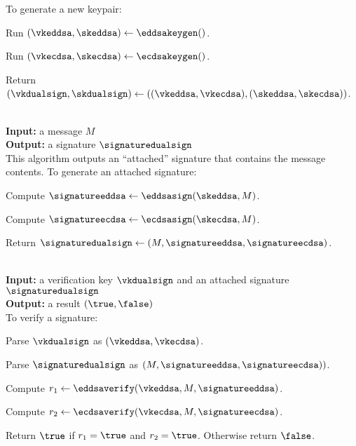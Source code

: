\vspace{-1.5em}
To generate a new keypair:

\vspace{-1.5em}
\begingroup
\RaggedRight
\begin{enumerate*}
\item Run $(\vkeddsa, \skeddsa) \leftarrow \eddsakeygen()$.
\item Run $(\vkecdsa, \skecdsa) \leftarrow \ecdsakeygen()$.
\item Return $(\vkdualsign, \skdualsign) \leftarrow \left( (\vkeddsa,\vkecdsa), (\skeddsa,\skecdsa) \right)$.
\end{enumerate*}
\endgroup


{\underline {\bf \dualsignsign}}\\
{\bf Input:} a message $M$\\
{\bf Output:} a signature $\signaturedualsign$ \\

\vspace{-1.5em}
This algorithm outputs an ``attached'' signature that contains the message contents. To generate an attached signature:

\vspace{-1.5em}
\begingroup
\RaggedRight
\begin{enumerate*}
\item Compute $\signatureeddsa \leftarrow \eddsasign(\skeddsa, M)$.
\item Compute $\signatureecdsa \leftarrow \ecdsasign(\skecdsa, M)$.
\item Return $\signaturedualsign \leftarrow \left(M, \signatureeddsa, \signatureecdsa \right)$.
\end{enumerate*}
\endgroup


{\underline {\bf \dualsignverify}}\\
{\bf Input:} a verification key $\vkdualsign$ and an attached signature $\signaturedualsign$\\
{\bf Output:} a result $(\true, \false)$ \\

\vspace{-1.5em}
To verify a signature:

\vspace{-1.5em}
\begin{enumerate*}
\item Parse $\vkdualsign$ as $(\vkeddsa,\vkecdsa)$.
\item Parse $\signaturedualsign$ as $\left( M, \signatureeddsa, \signatureecdsa) \right)$.
\item Compute $r_1 \leftarrow \eddsaverify(\vkeddsa, M, \signatureeddsa)$.
\item Compute $r_2 \leftarrow \ecdsaverify(\vkecdsa, M, \signatureecdsa)$.
\item Return $\true$ if $r_1 = \true$ and $r_2 = \true$. Otherwise return $\false$.
\end{enumerate*}

